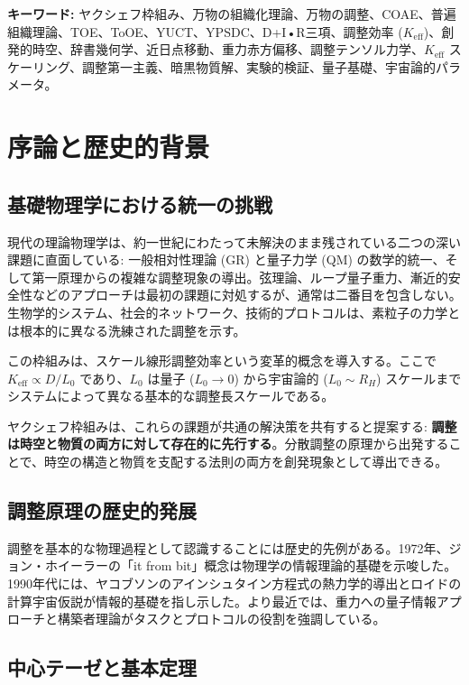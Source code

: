 \documentclass[11pt,a4paper]{article}
\begin{document}
	\noindent\textbf{キーワード:} ヤクシェフ枠組み、万物の組織化理論、万物の調整、COAE、普遍組織理論、TOE、ToOE、YUCT、YPSDC、D+I•R三項、調整効率 ($K_{\mathrm{eff}}$)、創発的時空、辞書幾何学、近日点移動、重力赤方偏移、調整テンソル力学、$K_{\mathrm{eff}}$ スケーリング、調整第一主義、暗黒物質解、実験的検証、量子基礎、宇宙論的パラメータ。
	
	\newpage
	
	\section{序論と歴史的背景}
	\subsection{基礎物理学における統一の挑戦}
	現代の理論物理学は、約一世紀にわたって未解決のまま残されている二つの深い課題に直面している: 一般相対性理論 (GR) と量子力学 (QM) の数学的統一、そして第一原理からの複雑な調整現象の導出。弦理論、ループ量子重力、漸近的安全性などのアプローチは最初の課題に対処するが、通常は二番目を包含しない。生物学的システム、社会的ネットワーク、技術的プロトコルは、素粒子の力学とは根本的に異なる洗練された調整を示す。
	
	この枠組みは、スケール線形調整効率という変革的概念を導入する。ここで $K_{\mathrm{eff}} \propto D/L_0$ であり、$L_0$ は量子 ($L_0 \to 0$) から宇宙論的 ($L_0 \sim R_H$) スケールまでシステムによって異なる基本的な調整長スケールである。
	
	ヤクシェフ枠組みは、これらの課題が共通の解決策を共有すると提案する: \textbf{調整は時空と物質の両方に対して存在的に先行する}。分散調整の原理から出発することで、時空の構造と物質を支配する法則の両方を創発現象として導出できる。
	
	\subsection{調整原理の歴史的発展}
	調整を基本的な物理過程として認識することには歴史的先例がある。1972年、ジョン・ホイーラーの「it from bit」概念は物理学の情報理論的基礎を示唆した。1990年代には、ヤコブソンのアインシュタイン方程式の熱力学的導出とロイドの計算宇宙仮説が情報的基礎を指し示した。より最近では、重力への量子情報アプローチと構築者理論がタスクとプロトコルの役割を強調している。
	
	\subsection{中心テーゼと基本定理}
	
\end{document}
